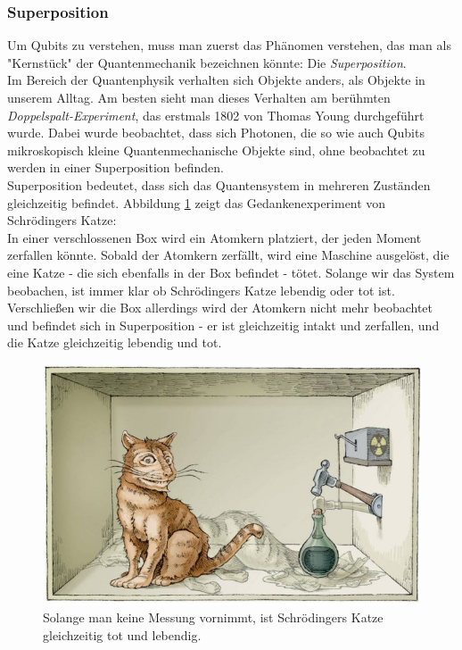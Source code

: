 \documentclass[12pt]{article}
\begin{document}
\subsubsection{Superposition}

Um Qubits zu verstehen, muss man zuerst das Phänomen verstehen, das man als "Kernstück" der Quantenmechanik bezeichnen könnte: Die \textit{Superposition}.\\

Im Bereich der Quantenphysik verhalten sich Objekte anders, als Objekte in unserem Alltag. Am besten sieht man dieses Verhalten am berühmten \textit{Doppelspalt-Experiment}, das erstmals 1802 von Thomas Young durchgeführt wurde. Dabei wurde beobachtet, dass sich Photonen, die so wie auch Qubits mikroskopisch kleine Quantenmechanische Objekte sind, ohne beobachtet zu werden in einer Superposition befinden. \cite{Lemmer2017} \\

Superposition bedeutet, dass sich das Quantensystem in mehreren Zuständen gleichzeitig befindet. Abbildung \ref{fig:Schrödinger} zeigt das Gedankenexperiment von Schrödingers Katze: \\
In einer verschlossenen Box wird ein Atomkern platziert, der jeden Moment zerfallen könnte. Sobald der Atomkern zerfällt, wird eine Maschine ausgelöst, die eine Katze - die sich ebenfalls in der Box befindet - tötet. Solange wir das System beobachen, ist immer klar ob Schrödingers Katze lebendig oder tot ist. Verschließen wir die Box allerdings wird der Atomkern nicht mehr beobachtet und befindet sich in Superposition - er ist gleichzeitig intakt und zerfallen, und die Katze gleichzeitig lebendig und tot. \cite{ImgSchrodinger}

\begin{figure}[h]
    \centering
    \includegraphics[width=0.7\linewidth]{PICS/Schrodinger.jpg}
    \caption{Solange man keine Messung vornimmt, ist Schrödingers Katze gleichzeitig tot und lebendig. \cite{ImgSchrodinger}}
    \label{fig:Schrödinger}
\end{figure}
\end{document}
